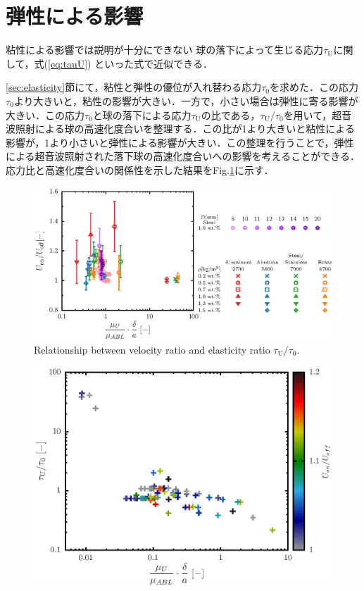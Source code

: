 \section{弾性による影響}

粘性による影響では説明が十分にできない
球の落下によって生じる応力$\tau_\text{U}$に関して，式(\ref{eq:tauU})
といった式で近似できる．

\ref{sec:elasticity}節にて，粘性と弾性の優位が入れ替わる応力$\tau_\text{0}$を求めた．この応力$\tau_\text{0}$より大きいと，粘性の影響が大きい．一方で，小さい場合は弾性に寄る影響が大きい．この応力$\tau_\text{0}$と球の落下による応力$\tau_\text{U}$の比である，$\tau_\text{U}/\tau_\text{0}$を用いて，超音波照射による球の高速化度合いを整理する．この比が1より大きいと粘性による影響が，1より小さいと弾性による影響が大きい．この整理を行うことで，弾性による超音波照射された落下球の高速化度合いへの影響を考えることができる．応力比と高速化度合いの関係性を示した結果をFig.\ref{fig:elastcity}に示す．

\begin{figure}[h]
    \centering
    \includegraphics[width=1.0\textwidth]{5-Results/elastcity.eps}
    \caption{Relationship between velocity ratio and elasticity ratio $\tau_\text{U}/\tau_\text{0}$.}
    \label{fig:elastcity}
\end{figure}

\begin{figure}[h]
    \centering
    \includegraphics[width=1.0\textwidth]{5-Results/elastcity_color.eps}
    \caption{}
    \label{fig:elastcityColor}
\end{figure}
